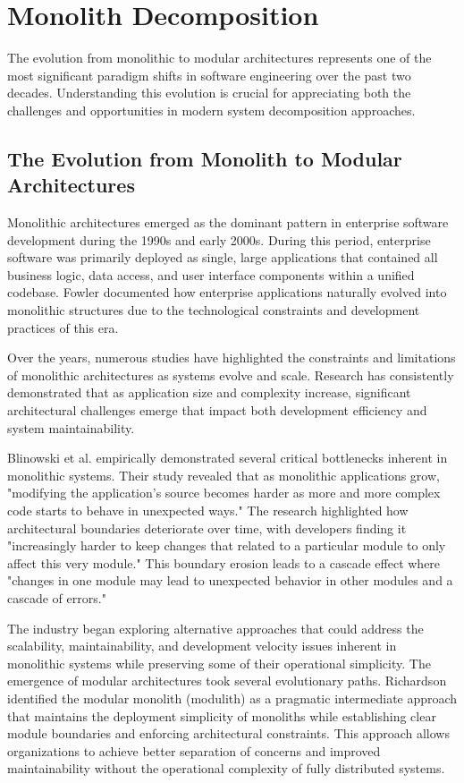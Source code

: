 \section{Monolith Decomposition}

The evolution from monolithic to modular architectures represents one of the most significant paradigm shifts in software engineering over the past two decades. Understanding this evolution is crucial for appreciating both the challenges and opportunities in modern system decomposition approaches.

\subsection{The Evolution from Monolith to Modular Architectures}
Monolithic architectures emerged as the dominant pattern in enterprise software development during the 1990s and early 2000s. During this period, enterprise software was primarily deployed as single, large applications that contained all business logic, data access, and user interface components within a unified codebase. Fowler \autocite{fowler2002patterns} documented how enterprise applications naturally evolved into monolithic structures due to the technological constraints and development practices of this era. 

Over the years, numerous studies have highlighted the constraints and limitations of monolithic architectures as systems evolve and scale. Research has consistently demonstrated that as application size and complexity increase, significant architectural challenges emerge that impact both development efficiency and system maintainability.

Blinowski et al. \autocite{Blinowski2022} empirically demonstrated several critical bottlenecks inherent in monolithic systems. Their study revealed that as monolithic applications grow, "modifying the application's source becomes harder as more and more complex code starts to behave in unexpected ways." The research highlighted how architectural boundaries deteriorate over time, with developers finding it "increasingly harder to keep changes that related to a particular module to only affect this very module." This boundary erosion leads to a cascade effect where "changes in one module may lead to unexpected behavior in other modules and a cascade of errors."

The industry began exploring alternative approaches that could address the scalability, maintainability, and development velocity issues inherent in monolithic systems while preserving some of their operational simplicity. The emergence of modular architectures took several evolutionary paths. Richardson \autocite{richardson2019microservices} identified the modular monolith (modulith) as a pragmatic intermediate approach that maintains the deployment simplicity of monoliths while establishing clear module boundaries and enforcing architectural constraints. This approach allows organizations to achieve better separation of concerns and improved maintainability without the operational complexity of fully distributed systems.

